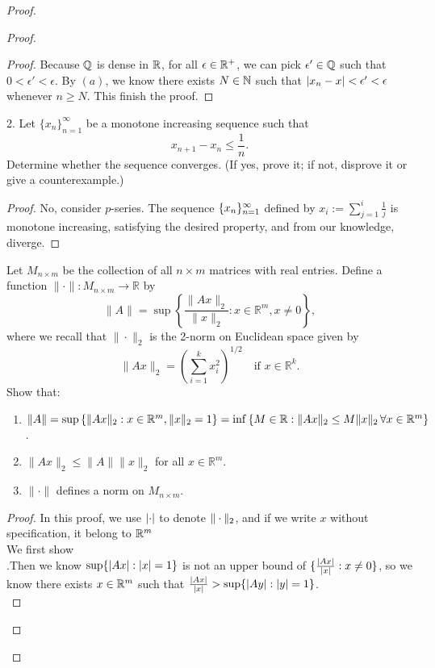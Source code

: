 \documentclass{report}
\begin{document}
\begin{proof}
\begin{proof}
\begin{proof}
Because $\mathbb{Q}$ is dense in  $\mathbb{R}$,  for all $\epsilon \in \mathbb{R}^+$, we can pick $\epsilon' \in \mathbb{Q}$ such that $0<\epsilon '< \epsilon $. By $(a)$,  we know there exists $N\in \mathbb{N}$ such that $\left|x_n-x\right|<\epsilon ' <\epsilon $ whenever $n\geq N$. This finish the proof.
\end{proof}
\begin{question}{}{}
2. Let $\{x_n\}_{n=1}^{\infty}$ be a monotone increasing sequence such that 
\[x_{n+1} - x_n \leq \frac{1}{n}.\]
Determine whether the sequence converges. (If yes, prove it; if not, disprove it or give a counterexample.)
\end{question}
\begin{proof}
No, consider $p$-series. The sequence $\{ x_n \}_{n=1}^{\infty}$ defined by $x_i:=\sum_{j=1}^i \frac{1}{j}$ is monotone increasing, satisfying the desired property, and from our knowledge, diverge. 
\end{proof}
\begin{question}{}{}
Let $M_{n \times m}$ be the collection of all $n \times m$ matrices with real entries. Define a function $\| \cdot \|: M_{n \times m} \to \mathbb{R}$ by
\[
\| A \| = \sup \left\{ \frac{\|Ax\|_2}{\|x\|_2} : x \in \mathbb{R}^m, x \neq 0 \right\},
\]
where we recall that $\| \cdot \|_2$ is the 2-norm on Euclidean space given by
\[
\| Ax \|_2 = \left( \sum_{i=1}^{k} x_i^2 \right)^{1/2} \quad \text{if } x \in \mathbb{R}^k.
\]
Show that:
\begin{enumerate}
    \item $\| A \| = \sup \left\{ \|Ax\|_2 : x \in \mathbb{R}^m, \| x \|_2 =1 \right\} = \inf \left\{ M \in \mathbb{R} : \|Ax\|_2 \leq M \|x\|_2 \, \forall x \in \mathbb{R}^m \right\}$.
    \item $\| Ax \|_2 \leq \| A \| \| x \|_2$ for all $x \in \mathbb{R}^m$.
    \item $\| \cdot \|$ defines a norm on $M_{n \times m}$.
\end{enumerate}
\end{question}
\begin{proof}
In this proof, we use $\left|\cdot\right|$ to denote $\| \cdot \|_2$, and if we write $x$ without specification, it belong to  $\mathbb{R}^m$\\

We first show \\

.Then we know $ \sup \{ \left|Ax\right|:\left|x\right|=1 \} $ is not an upper bound of $ \{ \frac{\left|Ax\right|}{\left|x\right|}:x\neq 0 \} $, so we know there exists $x\in \mathbb{R}^m$ such that $\frac{\left|Ax\right|}{\left|x\right|}>\sup \{ \left|Ay\right|:\left|y\right|=1 \}$.\\


\end{proof}
\end{proof}
\end{proof}
\end{document}

